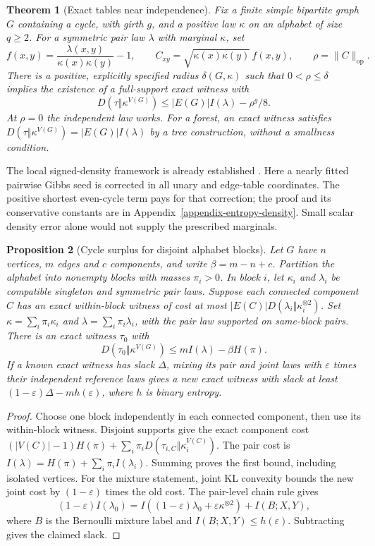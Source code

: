 \documentclass[a4paper,11pt,reqno]{amsart}
\theoremstyle{plain}
\newtheorem{theorem}{Theorem}[section]
\newtheorem{proposition}[theorem]{Proposition}
\theoremstyle{definition}
\theoremstyle{remark}
\begin{document}
\begin{theorem}[Exact tables near independence]
\label{theorem-local-table-entropy}
Fix a finite simple bipartite graph $G$ containing a cycle, with girth
$g$, and a positive law $\kappa$ on an alphabet of size $q\ge2$.
For a symmetric pair law $\lambda$ with marginal $\kappa$, set
\[
 f(x,y)=\frac{\lambda(x,y)}{\kappa(x)\kappa(y)}-1,
 \qquad C_{xy}=\sqrt{\kappa(x)\kappa(y)}\,f(x,y),
 \qquad \rho=\|C\|_{\mathrm{op}}.
\]
There is a positive, explicitly specified radius $\delta(G,\kappa)$
such that $0<\rho\le\delta$ implies the existence of a full-support
exact witness with
\[
 D(\tau\Vert\kappa^{V(G)})\le |E(G)|I(\lambda)-\rho^g/8.
\]
At $\rho=0$ the independent law works.  For a forest, an exact witness
satisfies $D(\tau\Vert\kappa^{V(G)})=|E(G)|I(\lambda)$ by a tree
construction, without a smallness condition.
\end{theorem}

The local signed-density framework is already established
\citep{lovasz2010}.  Here a nearly fitted pairwise Gibbs seed is corrected
in all unary and edge-table coordinates.  The positive shortest even-cycle
term pays for that correction; the proof and its conservative constants
are in Appendix~\ref{appendix-entropy-density}.  Small scalar density
error alone would not supply the prescribed marginals.

\begin{proposition}[Cycle surplus for disjoint alphabet blocks]
\label{proposition-alphabet-block-surplus}
Let $G$ have $n$ vertices, $m$ edges and $c$ components, and write
$\beta=m-n+c$.  Partition the alphabet into nonempty blocks with masses
$\pi_i>0$.  In block $i$, let $\kappa_i$ and $\lambda_i$ be compatible
singleton and symmetric pair laws.  Suppose each connected component $C$
has an exact within-block witness of cost at most
$|E(C)|D(\lambda_i\Vert\kappa_i^{\otimes2})$.
Set $\kappa=\sum_i\pi_i\kappa_i$ and
$\lambda=\sum_i\pi_i\lambda_i$, with the pair law supported on
same-block pairs.  There is an exact witness $\tau_0$ with
\[
 D(\tau_0\Vert\kappa^{V(G)})\le mI(\lambda)-\beta H(\pi).
\]
If a known exact witness has slack $\Delta$, mixing its pair and joint
laws with $\varepsilon$ times their independent reference laws gives
a new exact witness with slack at least
$(1-\varepsilon)\Delta-mh(\varepsilon)$, where $h$ is binary entropy.
\end{proposition}

\begin{proof}
Choose one block independently in each connected component, then use its
within-block witness.  Disjoint supports give the exact component cost
$(|V(C)|-1)H(\pi)+\sum_i\pi_iD(\tau_{i,C}\Vert\kappa_i^{V(C)})$.
The pair cost is $I(\lambda)=H(\pi)+\sum_i\pi_iI(\lambda_i)$.
Summing proves the first bound, including isolated vertices.
For the mixture statement, joint KL convexity bounds the new joint cost
by $(1-\varepsilon)$ times the old cost.  The pair-level chain rule gives
\[
 (1-\varepsilon)I(\lambda_0)
   =I((1-\varepsilon)\lambda_0+\varepsilon\kappa^{\otimes2})
     +I(B;X,Y),
\]
where $B$ is the Bernoulli mixture label and $I(B;X,Y)\le h(\varepsilon)$.
Subtracting gives the claimed slack.
\end{proof}
\end{document}
